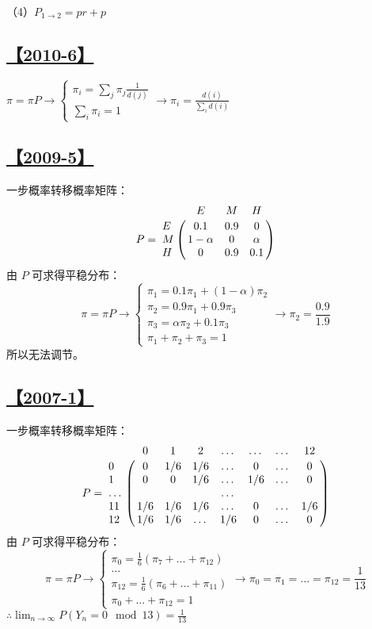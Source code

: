 （4）$P_{1\rightarrow2}=pr+p$

\subsection{\hyperref[Q2010-6]{【2010-6】}}\label{A2010-6}

$\pi=\pi P \rightarrow 
\begin{cases}\pi_i = \sum_j \pi_j \frac{1}{d(j)} \\
\sum_i \pi_i =1
\end{cases}
\rightarrow \pi_i = \frac{d(i)}{\sum_i d(i)}$

\subsection{\hyperref[Q2009-5]{【2009-5】}}\label{A2009-5}

一步概率转移概率矩阵：
$$
P=\bordermatrix{
	~ & E & M & H \cr
	E & 0.1 & 0.9 & 0 \cr
	M & 1-\alpha & 0 & \alpha \cr
	H & 0 & 0.9 & 0.1 \cr
}
$$
由 $P$ 可求得平稳分布：
$$
\pi=\pi P\rightarrow
\begin{cases}
\pi_1=0.1\pi_1 + (1-\alpha)\pi_2 \\
\pi_2=0.9\pi_1 + 0.9\pi_3\\
\pi_3=\alpha\pi_2+0.1\pi_3\\
\pi_1+\pi_2+\pi_3=1
\end{cases}
\rightarrow\pi_2=\frac{0.9}{1.9}
$$
所以无法调节。

\subsection{\hyperref[Q2007-1]{【2007-1】}}\label{A2007-1}

一步概率转移概率矩阵：
$$
P=\bordermatrix{
	~ & 0 & 1 & 2 & \dots & \dots & \dots & 12 \cr
	0 & 0 & 1/6 & 1/6 & \dots & 0 & \dots & 0 \cr
	1 & 0 & 0 & 1/6 & \dots & 1/6 & \dots & 0 \cr
	\dots & &&&\dots \cr
	11 & 1/6 & 1/6 & 1/6 & \dots & 0 & \dots & 1/6 \cr
	12 & 1/6 & 1/6 & \dots & 1/6 & 0 & \dots & 0 \cr
}
$$
由 $P$ 可求得平稳分布：
$$
\pi=\pi P\rightarrow
\begin{cases}
\pi_0=\frac{1}{6}(\pi_7 + \dots + \pi_{12}) \\
\dots \\
\pi_{12}=\frac{1}{6}(\pi_6 + \dots + \pi_{11})\\
\pi_0+\dots+\pi_{12}=1
\end{cases}
\rightarrow\pi_0=\pi_1=\dots=\pi_{12}=\frac{1}{13}
$$
$\therefore \lim_{n\rightarrow\infty}P(Y_n = 0 \mod 13)=\frac{1}{13}$
\\\\
